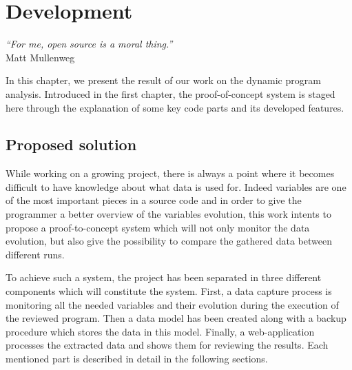 

\chapter{Development} %
\label{chap:development}
\begin{flushright}
\textit{``For me, open source is a moral thing.''} \\ Matt Mullenweg
\end{flushright}

In this chapter, we present the result of our work on the dynamic program analysis. Introduced in the first chapter, the proof-of-concept system is staged here through the explanation of some key code parts and its developed features.

\section{Proposed solution}
While working on a growing project, there is always a point where it becomes difficult to have knowledge about what data is used for. Indeed variables are one of the most important pieces in a source code and in order to give the programmer a better overview of the variables evolution, this work intents to propose a proof-to-concept system which will not only monitor the data evolution, but also give the possibility to compare the gathered data between different runs.

To achieve such a system, the project has been separated in three different components which will constitute the system. First, a data capture process is monitoring all the needed variables and their evolution during the execution of the reviewed program. Then a data model has been created along with a backup procedure which stores the data in this model. Finally, a web-application processes the extracted data and shows them for reviewing the results. Each mentioned part is described in detail in the following sections.

